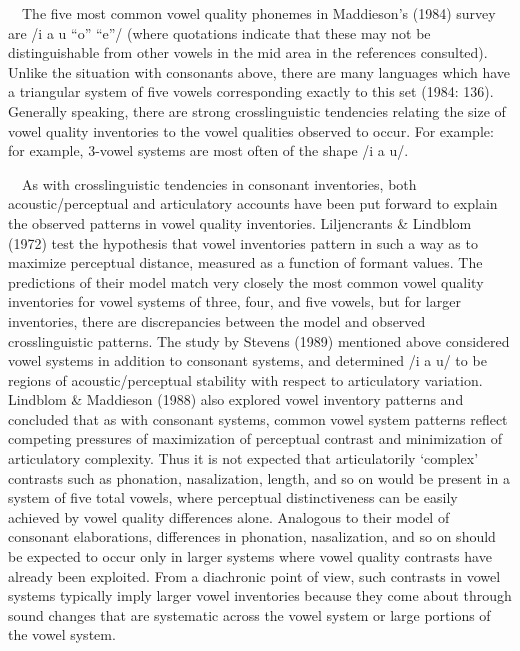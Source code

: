 \documentclass[12pt]{article}
\newenvironment{styleBody}{\renewcommand\baselinestretch{1.0}\setlength\leftskip{0in}\setlength\rightskip{0in plus 1fil}\setlength\parindent{0in}\setlength\parfillskip{0pt plus 1fil}\setlength\parskip{0in plus 1pt}\writerlistparindent\writerlistleftskip\leavevmode\normalfont\normalsize\fontsize{11pt}{13.2pt}\selectfont\mdseries\upshape\writerlistlabel\ignorespaces}{\unskip\vspace{0in plus 1pt}\par}
\newcommand\writerlistleftskip{}
\newcommand\writerlistparindent{}
\newcommand\writerlistlabel{}
\begin{document}
\begin{styleBody}
\ \ The five most common vowel quality phonemes in Maddieson’s (1984) survey are /i a u “o” “e”/ (where quotations indicate that these may not be distinguishable from other vowels in the mid area in the references consulted). Unlike the situation with consonants above, there are many languages which have a triangular system of five vowels corresponding exactly to this set (1984: 136). Generally speaking, there are strong crosslinguistic tendencies relating the size of vowel quality inventories to the vowel qualities observed to occur. For example: for example, 3-vowel systems are most often of the shape /i a u/. 
\end{styleBody}

\begin{styleBody}
\ \ As with crosslinguistic tendencies in consonant inventories, both acoustic/perceptual and articulatory accounts have been put forward to explain the observed patterns in vowel quality inventories. Liljencrants \& Lindblom (1972) test the hypothesis that vowel inventories pattern in such a way as to maximize perceptual distance, measured as a function of formant values. The predictions of their model match very closely the most common vowel quality inventories for vowel systems of three, four, and five vowels, but for larger inventories, there are discrepancies between the model and observed crosslinguistic patterns. The study by Stevens (1989) mentioned above considered vowel systems in addition to consonant systems, and determined /i a u/ to be regions of acoustic/perceptual stability with respect to articulatory variation. Lindblom \& Maddieson (1988) also explored vowel inventory patterns and concluded that as with consonant systems, common vowel system patterns reflect competing pressures of maximization of perceptual contrast and minimization of articulatory complexity. Thus it is not expected that articulatorily ‘complex’ contrasts such as phonation, nasalization, length, and so on would be present in a system of five total vowels, where perceptual distinctiveness can be easily achieved by vowel quality differences alone. Analogous to their model of consonant elaborations, differences in phonation, nasalization, and so on should be expected to occur only in larger systems where vowel quality contrasts have already been exploited. From a diachronic point of view, such contrasts in vowel systems typically imply larger vowel inventories because they come about through sound changes that are systematic across the vowel system or large portions of the vowel system.
\end{styleBody}
\end{document}

